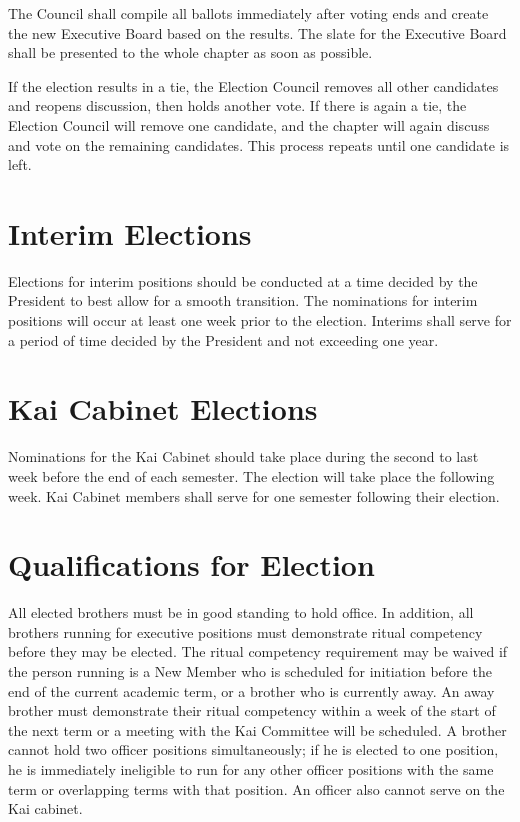 The Council shall compile all ballots immediately after voting ends and create
the new Executive Board based on the results.
The slate for the Executive Board shall be presented to the whole chapter as
soon as possible.

If the election results in a tie, the Election Council removes all other
candidates and reopens discussion, then holds another vote.
If there is again a tie, the Election Council will remove one candidate, and the
chapter will again discuss and vote on the remaining candidates.
This process repeats until one candidate is left.

\section{Interim Elections}
\label{sec:interim-elections}

Elections for interim positions should be conducted at a time decided by the
President to best allow for a smooth transition.
The nominations for interim positions will occur at least one week prior to the
election.
Interims shall serve for a period of time decided by the President and not
exceeding one year.

\section{Kai Cabinet Elections}
\label{sec:kai-cabinet-election-procedure}

Nominations for the Kai Cabinet should take place during the second to last week
before the end of each semester.
The election will take place the following week.
Kai Cabinet members shall serve for one semester following their election.

\section{Qualifications for Election}
\label{sec:qualifications-for-election}

All elected brothers must be in good standing to hold office.
In addition, all brothers running for executive positions must demonstrate
ritual competency before they may be elected.
The ritual competency requirement may be waived if the person running is a New
Member who is scheduled for initiation before the end of the current academic
term, or a brother who is currently away.
An away brother must demonstrate their ritual competency within a week of the
start of the next term or a meeting with the Kai Committee will be scheduled.
A brother cannot hold two officer positions simultaneously; if he is elected to
one position, he is immediately ineligible to run for any other officer
positions with the same term or overlapping terms with that position.
An officer also cannot serve on the Kai cabinet.

